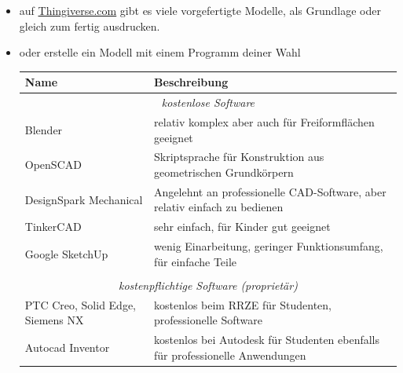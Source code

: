 \documentclass{\basedir/fablab-document}
\begin{document}
\begin{itemize}
    \item auf \href{https://thingiverse.com}{Thingiverse.com} gibt es viele vorgefertigte Modelle, als
        Grundlage oder gleich zum fertig ausdrucken.
    \item oder erstelle ein Modell mit einem Programm deiner Wahl
        \begin{table}[H]
            \centering
            \begin{tabularx}{\textwidth}{|l|X|}
                \hline \textbf{Name} & \textbf{Beschreibung} \\
                \hline \multicolumn{2}{|c|}{\textit{kostenlose Software}}  \\
                \hline Blender & relativ komplex aber auch für Freiformflächen geeignet  \\
                \hline OpenSCAD & Skriptsprache für Konstruktion aus geometrischen Grundkörpern \\
                \hline DesignSpark Mechanical & Angelehnt an professionelle CAD-Software, aber relativ einfach zu bedienen  \\
                \hline TinkerCAD & sehr einfach, für Kinder gut geeignet  \\
                \hline Google SketchUp & wenig Einarbeitung, geringer Funktionsumfang, für einfache Teile \\
                \hline & \\
                \hline \multicolumn{2}{|c|}{\textit{kostenpflichtige Software (proprietär)}}  \\
                \hline PTC Creo, Solid Edge, Siemens NX & kostenlos beim RRZE für Studenten, professionelle Software \\
                \hline Autocad Inventor & kostenlos bei Autodesk für Studenten ebenfalls für professionelle Anwendungen \\
                \hline
            \end{tabularx}
        \end{table}
\end{itemize}
\end{document}
